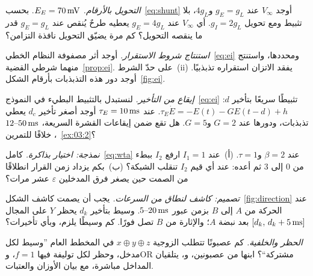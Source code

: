 \begin{exercise}[\lvlA]
\label{ex:03:1}
\emph{التحويل بالأرقام.} $E_E=70\,\text{mV}$. بحسب~\eqref{eq:shunt} أوجد $V_\infty$ عند $g_E=g_L$ و$4g_L$، بلا تثبيط ومع تحويل $g_I=2g_L$. أي $V_\infty$ عند $g_E=4g_L$ يعطيه طرحٌ يُنقص عند $g_E=g_L$ قدر ما ينقصه التحويل؟ كم مرة يضيّق التحويل نافذة التزامن؟
\end{exercise}

\begin{exercise}[\lvlB]
\label{ex:03:2}
\emph{استنتاج شروط الاستقرار.} أوجد أثر مصفوفة النظام الخطي~\eqref{eq:ei} ومحددها، واستنتج منهما شرطي القضية~\ref{prop:ei}. على حدّ الشرط~(ii) يفقد الاتزان استقراره تذبذبيًا. أوجد دور هذه التذبذبات بأرقام الشكل~\ref{fig:ei}.
\end{exercise}

\begin{exercise}[\lvlB]
\label{ex:03:3}
\emph{إيقاع من التأخير.} لنستبدل بالتثبيط البطيء في النموذج~\eqref{eq:ei} تثبيطًا سريعًا بتأخير $d$: $\tau_E\dot E=-E(t)-GE(t-d)+h$. عند $\tau_E=10\,\text{ms}$ أوجد أصغر تأخير $d_c$ يعطي تذبذبات، ودورها عند $G=2$ و$G=5$. هل تقع ضمن إيقاعات القشرة السريعة، $12\text{--}50\,\text{ms}$، خلافًا للتمرين~\ref{ex:03:2}؟
\end{exercise}

\begin{exercise}[\lvlB]
\label{ex:03:4}
\emph{نمذجة: اختيار بذاكرة.} كامل~\eqref{eq:wta} عند $\beta=2$ و$\tau=1$. (أ)~عند $I_1=1$ ارفع $I_2$ ببطء من $0$ إلى $3$ ثم أعده: عند أي قيم $I_2$ تنقلب الشبكة؟ (ب)~بكم يزداد زمن القرار انطلاقًا من الصمت حين يصغر فرق المدخلين $\varepsilon$ عشر مرات؟
\end{exercise}

\begin{exercise}[\lvlB]
\label{ex:03:5}
\emph{تصميم: كاشف لنطاق من السرعات.} يجب أن يصمت كاشف الشكل~\ref{fig:direction} عند الحركة من $A$ إلى $B$ بزمن عبور $5\text{--}20\,\text{ms}$. وسيط  بتأخير $d_k$ يحظر $Y$ على المجال $[d_k,\,d_k+5\,\text{ms}]$ بعد نبضة $A$؛ والإثارة من $B$ تصل فورًا. كم وسيطًا يلزم، وبأي تأخيرات؟
\end{exercise}

\begin{exercise}[\lvlB]
\label{ex:03:6}
\emph{الحظر والخلفية.} كم عصبونًا تتطلب الزوجية $x\oplus y\oplus z$ في المخطط العام ”وسيط  لكل مدخل، وحظر لكل توليفة فيها $f=1$، و\foreignlanguage{english}{OR} مشتركة“؟ ابنها من عصبونين،  و، يتلقيان المداخل مباشرة، مع بيان الأوزان والعتبات.
\end{exercise}

